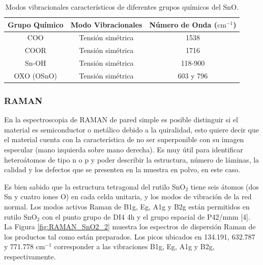 \documentclass[12pt]{article}
\begin{document}
\begin{table}[h!]
\centering
\caption{Modos vibracionales característicos de diferentes grupos químicos del SnO.}
\begin{tabular}{|c|c|c|}
\hline
\textbf{Grupo Químico} & \textbf{Modo Vibracionales} & \textbf{Número de Onda} (\(\text{cm}^{-1}\)) \\ \hline
COO                    & Tensión simétrica         & 1538                                         \\ \hline
COOR                   & Tensión simétrica         & 1716                                         \\ \hline
Sn-OH                  & Tensión simétrica         & 118-900                                     \\ \hline
OXO (OSnO)             & Tensión simétrica         & 603 y 796                                   \\ \hline
\end{tabular}

\label{tab:grupos_quimicos}
\end{table}
        
\subsubsection{RAMAN}
En la espectroscopia de RAMAN de pared simple es posible distinguir si el material es semiconductor o metálico debido a la quiralidad, esto quiere decir que el material cuenta con la característica de no ser superponible con su imagen especular (mano izquierda sobre mano derecha). Es muy útil para identificar heteroátomos de tipo n o p y poder describir la estructura, número de láminas, la calidad y los defectos que se presenten en la muestra en polvo, en este caso.\vspace{1em} %

 Es bien sabido que la estructura tetragonal del rutilo SnO$\displaystyle _{2}$ tiene seis átomos (dos Sn y cuatro iones O) en cada celda unitaria, y los modos de vibración de la red normal.  
Los modos activos Raman de B1g, Eg, A1g y B2g están permitidos en rutilo SnO$\displaystyle _{2}$ con el punto grupo de DI4 4h y el grupo espacial de P42/mnm [4]. La Figura \ref{fig:RAMAN_SnO2_2} muestra los espectros de dispersión Raman de los productos tal como están preparados. Los picos ubicados en 134.191, 632.787 y 771.778 cm$\displaystyle ^{-1}$ corresponder a las vibraciones B1g, Eg, A1g y B2g, respectivamente.\vspace{1em} %
\end{document}

